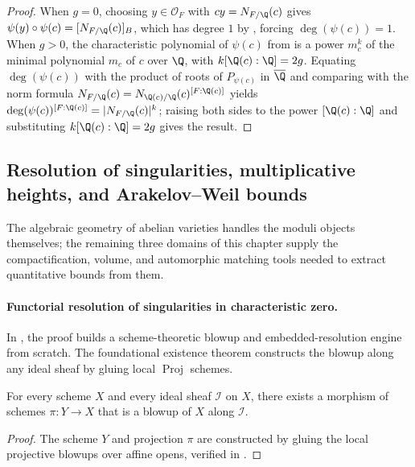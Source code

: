 \begin{proof}
When $g = 0$, choosing $y \in \mathcal{O}_F$ with $c y = N_{F/\Q}(c)$ gives
$\psi(y) \circ \psi(c) = [N_{F/\Q}(c)]_B$, which has degree $1$ by
, forcing $\deg(\psi(c)) = 1$.
When $g > 0$, the characteristic polynomial of $\psi(c)$ from
 is a power
$m_c^k$ of the minimal polynomial $m_c$ of $c$ over $\Q$, with
$k [\Q(c):\Q] = 2g$. Equating $\deg(\psi(c))$ with the product of roots of
$P_{\psi(c)}$ in $\overline{\Q}$ and comparing with the norm formula
$N_{F/\Q}(c) = N_{\Q(c)/\Q}(c)^{[F:\Q(c)]}$ yields
$\deg(\psi(c))^{[F:\Q(c)]} = |N_{F/\Q}(c)|^k$; raising both sides to the power
$[\Q(c):\Q]$ and substituting $k [\Q(c):\Q] = 2g$ gives the result.
\end{proof}

\subsection{Resolution of singularities, multiplicative heights, and Arakelov--Weil bounds}

The algebraic geometry of abelian varieties handles the moduli objects
themselves; the remaining three domains of this chapter supply the compactification,
volume, and automorphic matching tools needed to extract quantitative bounds
from them.

\paragraph{Functorial resolution of singularities in characteristic zero.}
In , the proof builds a
scheme-theoretic blowup and embedded-resolution engine from scratch. The
foundational existence theorem constructs the blowup along any ideal sheaf by
gluing local $\operatorname{Proj}$ schemes.

\begin{theorem}
\label{thm:blowup-exists}
For every scheme $X$ and every ideal sheaf $\mathcal{I}$ on $X$, there exists a
morphism of schemes $\pi : Y \to X$ that is a blowup of $X$ along $\mathcal{I}$.
\end{theorem}

\begin{proof}
The scheme $Y$ and projection $\pi$ are constructed by gluing the local
projective blowups over affine opens, verified in
.
\end{proof}

